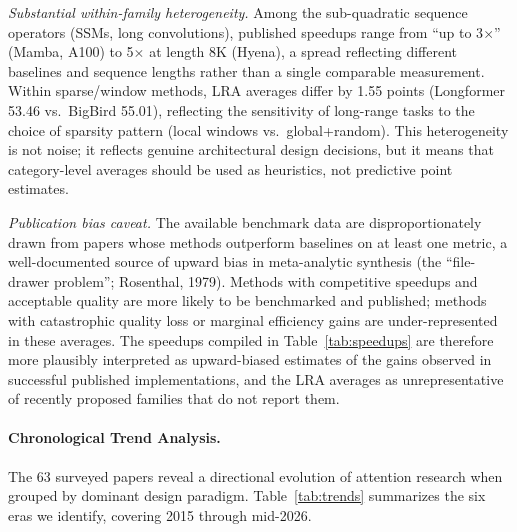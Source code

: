 \documentclass[10pt,twocolumn]{article}
\begin{document}
\textit{Substantial within-family heterogeneity.} Among the sub-quadratic sequence operators (SSMs, long convolutions), published speedups range from ``up to 3$\times$'' (Mamba, A100) to 5$\times$ at length 8K (Hyena), a spread reflecting different baselines and sequence lengths rather than a single comparable measurement. Within sparse/window methods, LRA averages differ by 1.55 points (Longformer 53.46 vs.\ BigBird 55.01), reflecting the sensitivity of long-range tasks to the choice of sparsity pattern (local windows vs.\ global+random). This heterogeneity is not noise; it reflects genuine architectural design decisions, but it means that category-level averages should be used as heuristics, not predictive point estimates.

\textit{Publication bias caveat.} The available benchmark data are disproportionately drawn from papers whose methods outperform baselines on at least one metric, a well-documented source of upward bias in meta-analytic synthesis (the ``file-drawer problem''; Rosenthal, 1979). Methods with competitive speedups and acceptable quality are more likely to be benchmarked and published; methods with catastrophic quality loss or marginal efficiency gains are under-represented in these averages. The speedups compiled in Table~\ref{tab:speedups} are therefore more plausibly interpreted as upward-biased estimates of the gains observed in successful published implementations, and the LRA averages as unrepresentative of recently proposed families that do not report them.

\paragraph{Chronological Trend Analysis.}
The 63 surveyed papers reveal a directional evolution of attention research when grouped by dominant design paradigm. Table~\ref{tab:trends} summarizes the six eras we identify, covering 2015 through mid-2026.
\end{document}
